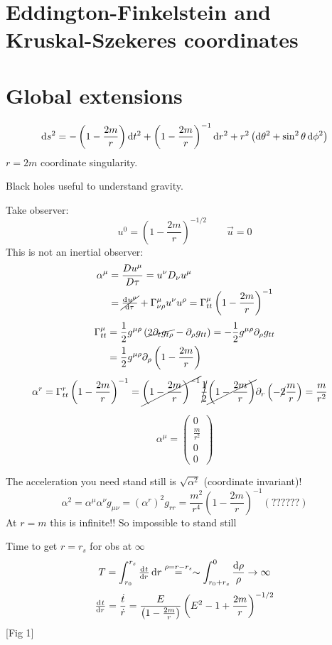 \section{Eddington-Finkelstein and Kruskal-Szekeres coordinates}
\section{Global extensions}


\[ \operatorname{d \!}{s}^2 = - \left(1- \frac{2m}{r}\right)\operatorname{d \!}{t}^2 + \left(1 - \frac{2m}{r}\right)^{-1}\operatorname{d \!}{r}^2 + r^2 \left(\operatorname{d \!}{\theta}^2 + \sin^2\theta \operatorname{d \!}{\phi}^2\right) \]
$r=2m$ coordinate singularity.

Black holes useful to understand gravity.

Take observer:
\[u^0 = \left(1- \frac{2m}{r}\right)^{-1/2} \qquad \vec{u} = 0\]
This is not an inertial observer:
\begin{align*}
\alpha^\mu &= \frac{Du^\mu}{D\tau} = u^\nu D_\nu u^\mu \\
&= \cancel{\od{u^\mu}{\tau}} + \Gamma^\mu_{\nu\rho}u^\nu u^\rho = \Gamma^\mu_{tt} \left(1- \frac{2m}{r}\right)^{-1}
\end{align*}
\begin{align*}
\Gamma^\mu_{tt} &= \frac{1}{2} g^{\mu\rho} \left(\cancel{2\partial_t g_{t\rho}} - \partial_\rho g_{tt}\right) = - \frac{1}{2}g^{\mu\rho}\partial_\rho g_{tt} \\
&= \frac{1}{2} g^{\mu\rho}\partial_\rho \left(1- \frac{2m}{r}\right)
\end{align*}
\begin{align*}
\alpha^r &= \Gamma^r_{tt} \left(1- \frac{2m}{r}\right)^{-1} = \cancel{\left(1- \frac{2m}{r}\right)^{-1}}\cancel{\frac{1}{2}}\cancel{\left(1- \frac{2m}{r}\right)}\partial_r \left(-\cancel{2}\frac{m}{r}\right) = \frac{m}{r^2}
\end{align*}

\[ \alpha^\mu = \begin{pmatrix}
0\\ \frac{m}{r^2} \\ 0 \\ 0
\end{pmatrix} \]

The acceleration you need stand still is $\sqrt{\alpha^2}$ (coordinate invariant)!
\[ \alpha^2 = \alpha^\mu\alpha^\nu g_{\mu\nu} = (\alpha^r)^2g_{rr} = \frac{m^2}{r^4}(1- \frac{2m}{r})^{-1} (??????) \]
At $r=m$ this is infinite!! So impossible to stand still

Time to get $r=r_s$ for obs at $\infty$
\[ T = \int^{r_s}_{r_0} \od{t}{r}\diff{r} \overset{\rho = r-r_s}{=} \sim \int^0_{r_0+r_s} \frac{\diff{\rho}}{\rho} \to \infty \]
\[ \od{t}{r} = \frac{\dot{t}}{\dot{r}} = \frac{E}{\left(1 - \frac{2m}{r}\right)}\left(E^2 - 1 + \frac{2m}{r}\right)^{-1/2} \]
[Fig 1]

